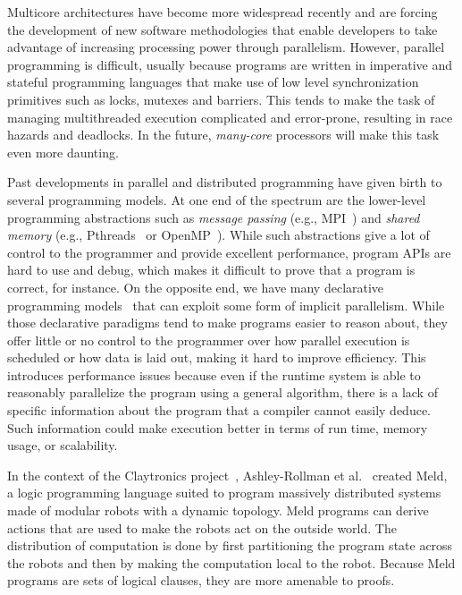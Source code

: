 Multicore architectures have become more widespread recently and are forcing the
development of new software methodologies that enable developers to take
advantage of increasing processing power through parallelism. However, parallel
programming is difficult, usually because programs are written in imperative and
stateful programming languages that make use of low level synchronization
primitives such as locks, mutexes and barriers. This tends to make the task of
managing multithreaded execution complicated and error-prone, resulting in race
hazards and deadlocks. In the future, \emph{many-core} processors will make this
task even more daunting.

Past developments in parallel and distributed programming have given birth to
several programming models. At one end of the spectrum are the lower-level
programming abstractions such as \emph{message passing} (e.g.,
MPI~\cite{gabriel04-open-mpi}) and \emph{shared memory} (e.g.,
Pthreads~\cite{Butenhof:1997:PPT:263953} or
OpenMP~\cite{Chapman-2007-UOP-1370966}). While such abstractions give a lot of
control to the programmer and provide excellent performance, program APIs are
hard to use and debug, which makes it difficult to prove that a program is
correct, for instance. On the opposite end, we have many declarative programming
models~\cite{Blelloch:1996:PPA:227234.227246} that can exploit some form of
implicit parallelism.  While those declarative paradigms tend to make programs
easier to reason about, they offer little or no control to the programmer over
how parallel execution is scheduled or how data is laid out, making it hard to
improve efficiency. This introduces performance issues because even if the
runtime system is able to reasonably parallelize the program using a general
algorithm, there is a lack of specific information about the program that a
compiler cannot easily deduce. Such information could make execution better in
terms of run time, memory usage, or scalability.

In the context of the Claytronics project~\cite{goldstein-computer05},
Ashley-Rollman et al.~\cite{ashley-rollman-iclp09,
ashley-rollman-derosa-iros07wksp} created Meld, a logic programming language
suited to program massively distributed systems made of modular robots with a
dynamic topology. Meld programs can derive actions that are used to make the
robots act on the outside world. The distribution of computation is done by
first partitioning the program state across the robots and then by making the
computation local to the robot. Because Meld programs are sets of logical
clauses, they are more amenable to proofs.

